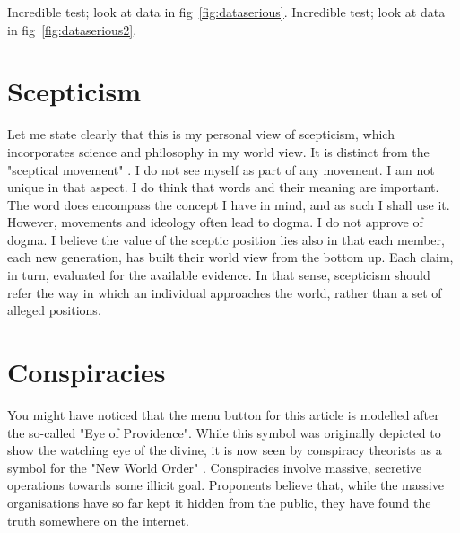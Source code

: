 \begin{multicols}{2}


Incredible test; look at data in fig~\ref{fig:dataserious}. Incredible test; look at data in fig~\ref{fig:dataserious2}.

\section{Scepticism}

Let me state clearly that this is my personal view of scepticism, which incorporates science and philosophy in my world view. It is distinct
from the "sceptical movement" \cite{wikism}. I do not see myself as 
part of any movement. I am not unique in that aspect. I do think that words and their meaning are important. The word does encompass the
concept I have in mind, and as such I shall use it. However, movements and ideology often lead to dogma. I do not approve of dogma. I believe
the value of the sceptic position lies also in that each member, each new generation, has built their world view from the bottom up. Each claim,
in turn, evaluated for the available evidence. In that sense, scepticism should refer the way in which an individual approaches the world, rather
than a set of alleged positions.

\section{Conspiracies}

You might have noticed that the menu button for this article is modelled after the so-called "Eye of Providence". While this symbol was originally
depicted to show the watching eye of the divine, it is now seen by conspiracy theorists as a symbol for the "New World Order" \cite{wikinwo}.
Conspiracies involve massive, secretive operations towards some illicit goal. Proponents believe that, while the massive
organisations have so far kept it hidden from the public, they have found the truth somewhere on the internet.



\end{multicols}
